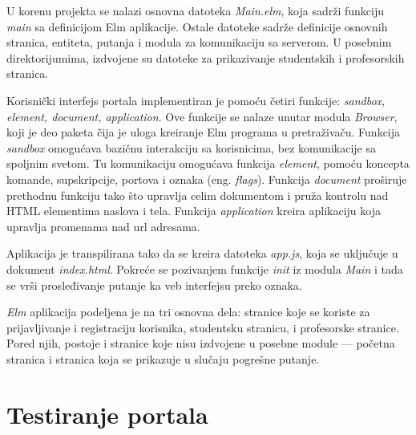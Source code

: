 \documentclass[12pt,oneside]{memoir}
\begin{document}
\par U korenu projekta se nalazi osnovna datoteka \emph{Main.elm}, koja sadrži funkciju \emph{main} sa definicijom Elm aplikacije. Ostale datoteke sadrže definicije osnovnih stranica, entiteta, putanja i modula za komunikaciju sa serverom. U posebnim direktorijumima, izdvojene su datoteke za prikazivanje studentskih i profesorskih stranica. 
\par Korisnički interfejs portala implementiran je pomoću četiri funkcije: \emph{sandbox, element, document, application}. Ove funkcije se nalaze unutar modula \emph{Browser}, koji je deo paketa čija je uloga kreiranje Elm programa u pretraživaču. Funkcija \emph{sandbox} omogućava bazičnu interakciju sa korisnicima, bez komunikacije sa spoljnim svetom. Tu komunikaciju omogućava funkcija \emph{element}, pomoću koncepta komande, supskripcije, portova i oznaka (eng. \emph{flags}). Funkcija \emph{document} proširuje prethodnu funkciju tako što upravlja celim dokumentom i pruža kontrolu nad HTML elementima naslova i tela. Funkcija \emph{application} kreira aplikaciju koja upravlja promenama nad url adresama. 
\par Aplikacija je transpilirana tako da se kreira datoteka \emph{app.js}, koja se uključuje u dokument \emph{index.html}. Pokreće se pozivanjem funkcije \emph{init} iz modula \emph{Main} i tada se vrši prosleđivanje putanje ka veb interfejsu preko oznaka. 
\par \emph{Elm} aplikacija podeljena je na tri osnovna dela: stranice koje se koriste za prijavljivanje i registraciju korisnika, studentsku stranicu, i profesorske stranice. Pored njih, postoje i stranice koje nisu izdvojene u posebne module --- početna stranica i stranica koja se prikazuje u slučaju pogrešne putanje.


\section{Testiranje portala}
\end{document}
